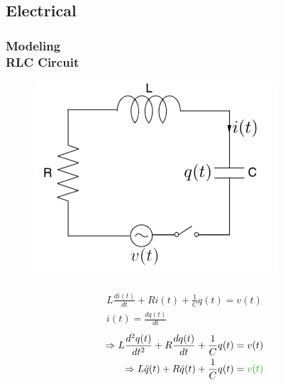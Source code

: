 \documentclass[hyperref={pdfpagelabels=true}]{beamer}
\begin{document}
\subsection{Electrical}
\begin{frame}
\frametitle{Modeling\\ {\large RLC Circuit}} 
\begin{figure}[!t]
\centering
\includegraphics[scale = 0.35]{figs/Selection_020.png}
\end{figure}
\begin{align}
L \frac{di(t)}{dt}+Ri(t)+\frac{1}{C}q(t)=v(t) \\
 i(t)=\frac{dq(t)}{dt}
\end{align} 
\begin{eqnarray*}
\Rightarrow L\frac{d^2q(t)}{dt^2}+R\frac{dq(t)}{dt}+\frac{1}{C}q(t)=v(t) \\
\Rightarrow L\ddot{q}(t)+R\dot{q}(t)+\frac{1}{C}q(t)=\textcolor{mygreen}{v(t)}
\end{eqnarray*}
\end{frame}
\end{document}
